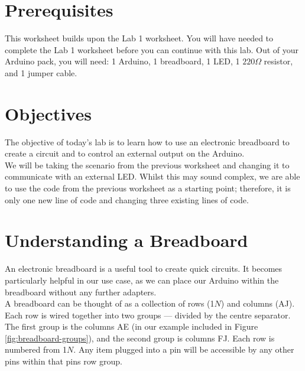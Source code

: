 \documentclass[11pt,a4paper]{article}
\begin{document}
\pagestyle{fancy}

\section*{Prerequisites}
This worksheet builds upon the Lab 1 worksheet. You will have needed to complete the Lab 1 worksheet before you can continue with this lab. Out of your Arduino pack, you will need: 1 Arduino, 1 breadboard, 1 LED, 1 $220\Omega$ resistor, and 1 jumper cable.

\section*{Objectives}
The objective of today's lab is to learn how to use an electronic breadboard to create a circuit and to control an external output on the Arduino.\\

\noindent
We will be taking the scenario from the previous worksheet and changing it to communicate with an external LED. Whilst this may sound complex, we are able to use the code from the previous worksheet as a starting point; therefore, it is only one new line of code and changing three existing lines of code.

\section*{Understanding a Breadboard}
An electronic breadboard is a useful tool to create quick circuits. It becomes particularly helpful in our use case, as we can place our Arduino within the breadboard without any further adapters.\\

\noindent
A breadboard can be thought of as a collection of rows (1\textrightarrow $N$) and columns (A\textrightarrow J). Each row is wired together into two groups --- divided by the centre separator. The first group is the columns A\textrightarrow E (in our example included in Figure \ref{fig:breadboard-groups}), and the second group is columns F\textrightarrow J. Each row is numbered from 1\textrightarrow $N$. Any item plugged into a pin will be accessible by any other pins within that pins row group.\\
\end{document}
